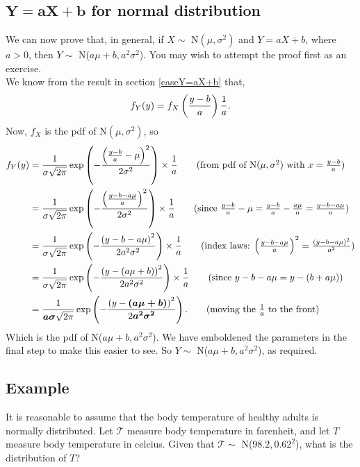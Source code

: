 \subsection{$\boldsymbol{Y = aX + b}$ for normal distribution} \label{sec21.3}
We can now prove that, in general, if $X \sim$ N$(\mu,\sigma^2)$ and $Y = aX + b$, where $a > 0$, then $Y \sim$ N($a\mu + b,a^2\sigma^2$). You may wish to attempt the proof first as an exercise. \\

\solution
We know from the result in section \ref{caseY=aX+b} that,
\[
f_Y(y) = f_X\left(\frac{y-b}{a}\right)\frac{1}{a}.
\]
Now, $f_X$ is the pdf of N$(\mu,\sigma^2)$, so
\begin{align*}
f_Y(y) & = \frac{1}{\sigma \sqrt{2\pi}}\exp\brac{-\frac{\brac{\frac{y-b}{a}-\mu}^2}{2\sigma^2}} \times \frac{1}{a} \tag{from pdf of N$(\mu,\sigma^2)$ with $x = \frac{y-b}{a}$} \\
	& = \frac{1}{\sigma \sqrt{2\pi}}\exp\brac{-\frac{\brac{\frac{y-b - a\mu}{a}}^2}{2\sigma^2}} \times \frac{1}{a} \tag{since $\frac{y-b}{a} - \mu = \frac{y-b}{a} - \frac{a\mu}{a} = \frac{y-b - a\mu}{a}$} \\
	& = \frac{1}{\sigma \sqrt{2\pi}}\exp\brac{-\frac{\brac{y-b - a\mu}^2}{2a^2\sigma^2}} \times \frac{1}{a} \tag{index laws: $\bfrac{y-b - a\mu}{a}^2 = \frac{(y-b - a\mu)^2}{a^2}$} \\
	& =  \frac{1}{\sigma \sqrt{2\pi}}\exp\brac{-\frac{\brac{y - (a\mu + b)}^2}{2a^2\sigma^2}}\times \frac{1}{a} \tag{since $y-b - a\mu = y-(b + a\mu)$} \\
	& =  \frac{1}{\boldsymbol{a \sigma} \sqrt{2\pi}}\exp\brac{-\frac{\brac{y - \boldsymbol{(a\mu + b)}}^2}{2\boldsymbol{a^2\sigma^2}}}. \tag{moving the $\frac{1}{a}$ to the front}
\end{align*}
Which is the pdf of N($a\mu + b,a^2\sigma^2$). We have emboldened the parameters in the final step to make this easier to see. So $Y \sim$ N($a\mu + b,a^2\sigma^2$), as required.

\subsection{Example}
It is reasonable to assume that the body temperature of healthy adults is normally distributed. Let $\mathcal{T}$ measure body temperature in farenheit, and let $T$ measure body temperature in celcius. Given that $\mathcal{T} \sim$ N($98.2,0.62^2$), what is the distribution of $T$? \\

